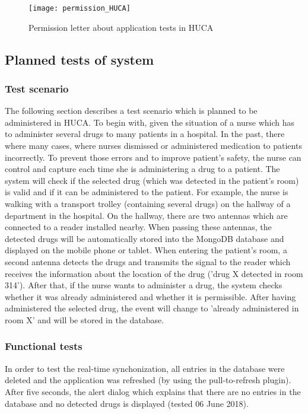 \begin{figure}
\centering
\texttt{[image: permission\_HUCA]} 
\caption{\label{fig:permission}Permission letter about application tests in HUCA} 
\end{figure}

\subsection{Planned tests of system}

\subsubsection{Test scenario}

The following section describes a test scenario which is planned to be administered in HUCA. 
To begin with, given the situation of a nurse which has to administer several drugs to many patients in a hospital. In the past, there where many cases, where nurses dismissed or administered medication to patients incorrectly. To prevent those errors and to improve patient's safety, the nurse can control and capture each time she is administering a drug to a patient. The system will check if the selected drug (which was detected in the patient's room) is valid and if it can be administered to the patient. For example, the nurse is walking with a transport trolley (containing several drugs) on the hallway of a department in the hospital. On the hallway, there are two antennas which are connected to a reader installed nearby. When passing these antennas, the detected drugs will be automatically stored into the MongoDB database and displayed on the mobile phone or tablet. 
When entering the patient's room, a second antenna detects the drugs and transmits the signal to the reader which receives the information about the location of the drug ('drug X detected in room 314'). After that, if the nurse wants to administer a drug, the system checks whether it was already administered and whether it is permissible. After having administered the selected drug, the event will change to 'already administered in room X' and will be stored in the database. 

\subsubsection{Functional tests}

In order to test the real-time synchonization, all entries in the database were deleted and the application was refreshed (by using the pull-to-refresh plugin). After five seconds, the alert dialog which explains that there are no entries in the database and no detected drugs is displayed (tested 06 June 2018). 

